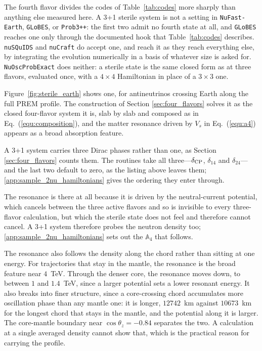 \documentclass[final,5p,times,twocolumn,sort,compress]{elsarticle}
\newcommand{\eq}{Eq.}
\newcommand{\equ}[1]{\eq~(\ref{equ:#1})}
\begin{document}
The fourth flavor divides the codes of Table~\ref{tab:codes} more sharply than anything else measured here.  A 3+1 sterile system is not a setting in {\tt NuFast-Earth}, {\tt GLoBES}, or {\tt Prob3++}: the first two admit no fourth state at all, and {\tt GLoBES} reaches one only through the documented hook that Table~\ref{tab:codes} describes.  {\tt nuSQuIDS} and {\tt nuCraft} do accept one, and reach it as they reach everything else, by integrating the evolution numerically in a basis of whatever size is asked for.  {\tt NuOscProbExact} does neither: a sterile state is the same closed form as at three flavors, evaluated once, with a $4 \times 4$ Hamiltonian in place of a $3 \times 3$ one.

Figure~\ref{fig:sterile_earth} shows one, for antineutrinos crossing Earth along the full PREM profile.  The construction of Section \ref{sec:four_flavors} solves it as the closed four-flavor system it is, slab by slab and composed as in \equ{composition}, and the matter resonance driven by $V_s$ in \equ{a4} appears as a broad absorption feature.

A 3+1 system carries three Dirac phases rather than one, as Section \ref{sec:four_flavors} counts them.  The routines take all three---$\delta_{\rm CP}$, $\delta_{14}$ and $\delta_{24}$---and the last two default to zero, as the listing above leaves them; \ref{app:sample_2nu_hamiltonians} gives the ordering they enter through.

The resonance is there at all because it is driven by the neutral-current potential, which cancels between the three active flavors and so is invisible to every three-flavor calculation, but which the sterile state does not feel and therefore cannot cancel.  A 3+1 system therefore probes the neutron density too; \ref{app:sample_2nu_hamiltonians} sets out the $\mathbb{A}_4$ that follows.

The resonance also follows the density along the chord rather than sitting at one energy.  For trajectories that stay in the mantle, the resonance is the broad feature near $4$~TeV.  Through the denser core, the resonance moves down, to between $1$ and $1.4$~TeV, since a larger potential sets a lower resonant energy.  It also breaks into finer structure, since a core-crossing chord accumulates more oscillation phase than any mantle one: it is longer, $12742$~km against $10673$~km for the longest chord that stays in the mantle, and the potential along it is larger.  The core-mantle boundary near $\cos\theta_z = -0.84$ separates the two.  A calculation at a single averaged density cannot show that, which is the practical reason for carrying the profile.
\end{document}
